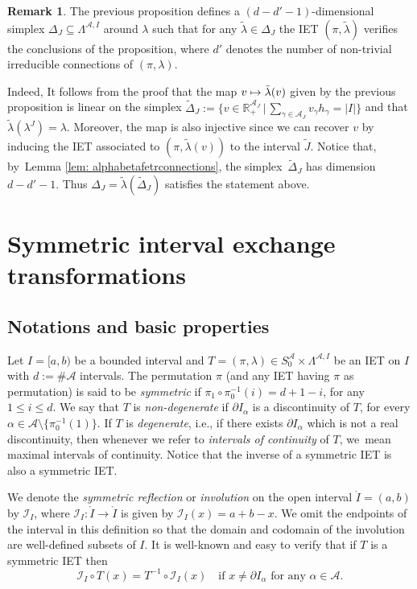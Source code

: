 \documentclass[10pt,a4paper]{amsart}
\newcommand\mto{\mathchoice{\longmapsto}{\mapsto}{\mapsto}{\mapsto}}
\theoremstyle{plain}
\theoremstyle{definition}
\newtheorem{remark}[theorem]{Remark}
\newcommand{\A}{\mathcal{A}}
\newcommand{\R}{\mathbb{R}}
\begin{document}
\begin{remark}
\label{rmk:simplex}
The previous proposition defines a $(d - d' - 1)$-dimensional simplex $\Delta_J \subseteq \Lambda^{\A, I}$ around $\lambda$ such that for any $\tilde \lambda \in \Delta_J$ the IET $(\pi, \tilde\lambda)$ verifies the conclusions of the proposition, where $d'$ denotes the number of non-trivial {irreducible} connections of $(\pi, \lambda)$.

Indeed, It follows from the proof that the map $v \mto \tilde{\lambda}(v)$ given by the previous proposition is linear on the simplex $\tilde \Delta_J:= \big\{v \in \R^{\A_J}_+ \, \big| \, \sum_{\gamma \in \A_J} v_\gamma h_\gamma = |I| \big\} $ and that $\tilde\lambda(\lambda^J) = \lambda$. Moreover, the map is also injective since we can recover $v$ by inducing the IET associated to $(\pi, \tilde\lambda(v))$ to the interval $\tilde J$. Notice that, by~Lemma \ref{lem: alphabetafetrconnections}, the simplex~$\tilde \Delta_J$ has dimension $d - d' -1$. Thus $\Delta_J = \tilde\lambda(\tilde \Delta_J)$ satisfies the statement above.
\end{remark}

\section{Symmetric interval exchange transformations}

\subsection{Notations and basic properties}
Let $I = [a, b)$ be a bounded interval and $T=(\pi, \lambda) \in S_0^\A \times \Lambda^{\A, I}$ be an IET on $I$ with $d := \#\A$ intervals. The permutation $\pi$ (and any IET having $\pi$ as permutation) is said to be \textit{symmetric} if $\pi_{1}\circ \pi^{-1}_{0}(i)=d+1-i$, for any $1 \leq i \leq d$. We say that $T$ is \emph{non-degenerate} if $\partial I_{\alpha}$ is a discontinuity of $T$, for every $\alpha\in \A {\setminus \{\pi_0^{-1}(1)\}}$. If $T$ is \emph{degenerate}, i.e., if there exists $\partial I_{\alpha}$ which is not a real discontinuity, then whenever we refer to \emph{intervals of continuity} of $T$, we~mean maximal intervals of continuity. Notice that the inverse of a symmetric IET is also a symmetric IET.

We denote the \emph{symmetric reflection} or \emph{involution} on the open interval $\mathring{I} = (a, b)$ by $\mathcal{I}_I$, where $\mathcal{I}_I: \mathring{I}\to \mathring{I}$ is given by $\mathcal{I}_I(x)= a + b - x$. We omit the endpoints of the interval in this definition so that the domain and codomain of the involution are well-defined subsets of $I$.
It is well-known and easy to verify that if $T$ is a symmetric IET then
\begin{equation}\label{eq: standardconjugacy}
\mathcal{I}_I\circ T(x)=T^{-1}\circ\mathcal{I}_I(x) \quad \text{if } x \neq \partial I_{\alpha} \text{ for any } \alpha \in \A.
\end{equation}
\end{document}
